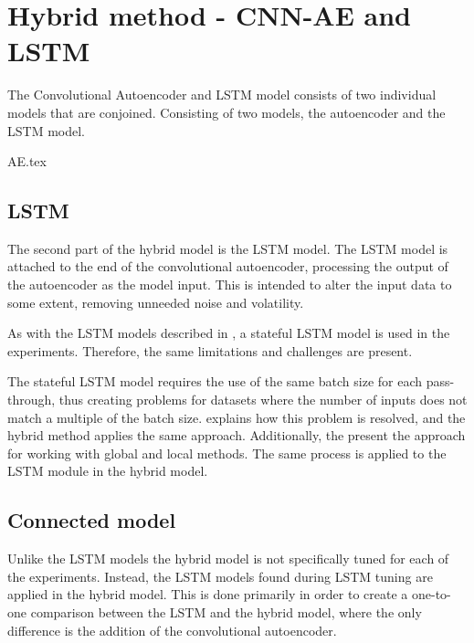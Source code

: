 
\section{Hybrid method - CNN-AE and LSTM}
\label{section:Method:CNN-AE-LSTM}


The Convolutional Autoencoder and LSTM model consists of two individual models that are conjoined.
Consisting of two models,
the autoencoder and the LSTM model.


{AE.tex}


\subsection{LSTM}

The second part of the hybrid model is the LSTM model.
The LSTM model is attached to the end of the convolutional autoencoder,
processing the output of the autoencoder as the model input.
This is intended to alter the input data to some extent, removing unneeded noise and volatility.

As with the LSTM models described in , a stateful LSTM model is used in the experiments.
Therefore, the same limitations and challenges are present.

The stateful LSTM model requires the use of the same batch size for each pass-through, thus creating problems for datasets where the number
of inputs does not match a multiple of the batch size.
 explains how this problem is resolved, and the hybrid method applies the same approach.
Additionally,
the  present the approach for working with global and local methods.
The same process is applied to the LSTM module in the hybrid model.


\subsection{Connected model}

Unlike the LSTM models  the hybrid model is not specifically tuned for each of the experiments.
Instead, the LSTM models found during LSTM tuning are applied in the hybrid model.
This is done primarily in order to create a one-to-one comparison between the LSTM and the hybrid model,
where the only difference is the addition of the convolutional autoencoder.






